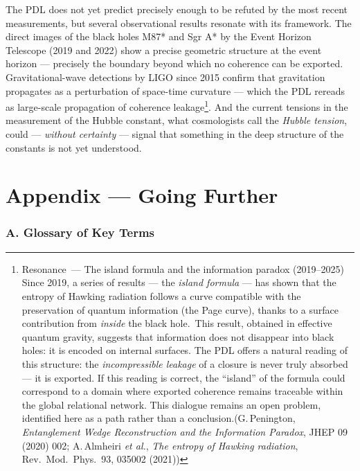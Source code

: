 \documentclass[11pt, a4paper, openright]{book}
\begin{document}
The PDL does not yet predict precisely enough to be refuted by the most recent measurements, but several observational results resonate with its framework. The direct images of the black holes M87* and Sgr A* by the Event Horizon Telescope (2019 and 2022) show a precise geometric structure at the event horizon — precisely the boundary beyond which no coherence can be exported. Gravitational-wave detections by LIGO since 2015 confirm that gravitation propagates as a perturbation of space-time curvature — which the PDL rereads as large-scale propagation of coherence leakage\footnote{{Resonance~--- The island formula and the information paradox (2019--2025)} Since 2019, a series of results --- the \emph{island formula} --- has shown that the entropy of Hawking radiation follows a curve compatible with the preservation of quantum information (the Page curve), thanks to a surface contribution from \emph{inside} the black hole.\footnotemark\ This result, obtained in effective quantum gravity, suggests that information does not disappear into black holes: it is encoded on internal surfaces. The PDL offers a natural reading of this structure: the \emph{incompressible leakage} of a closure is never truly absorbed --- it is exported. If this reading is correct, the ``island'' of the formula could correspond to a domain where exported coherence remains traceable within the global relational network. This dialogue remains an open problem, identified here as a path rather than a conclusion.(G.\,Penington, \textit{Entanglement Wedge Reconstruction and the Information Paradox}, JHEP 09 (2020) 002; A.\,Almheiri \textit{et al.}, \textit{The entropy of Hawking radiation},
Rev.\ Mod.\ Phys.\ 93, 035002 (2021))}. And the current tensions in the measurement of the Hubble constant, what cosmologists call the \emph{Hubble tension}, could — \emph{without certainty} — signal that something in the deep structure of the constants is not yet understood.

\backmatter
\appendix

\chapter*{Appendix — Going Further}

\subsection*{A. Glossary of Key Terms}
\end{document}
